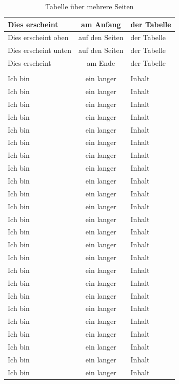 \documentclass[
12pt,
ngerman
]{scrreprt}
\begin{document}
\begin{longtable}{lcl}
  \toprule
  Dies erscheint & am Anfang & der Tabelle \\
  \bottomrule
  \endfirsthead
  \midrule
  Dies erscheint oben & auf den Seiten & der Tabelle \\
  \midrule
  \endhead
  \midrule
  Dies erscheint unten & auf den Seiten & der Tabelle \\
  \midrule
  \endfoot
  \toprule
  Dies erscheint & am Ende & der Tabelle \\
  \bottomrule
  \caption{Tabelle über mehrere Seiten} \\
  \endlastfoot
  \label{tab:longtable}
  Ich bin & ein langer & Inhalt \\
  Ich bin & ein langer & Inhalt \\
  Ich bin & ein langer & Inhalt \\
  Ich bin & ein langer & Inhalt \\
  Ich bin & ein langer & Inhalt \\
  Ich bin & ein langer & Inhalt \\
  Ich bin & ein langer & Inhalt \\
  Ich bin & ein langer & Inhalt \\
  Ich bin & ein langer & Inhalt \\
  Ich bin & ein langer & Inhalt \\
  Ich bin & ein langer & Inhalt \\
  Ich bin & ein langer & Inhalt \\
  Ich bin & ein langer & Inhalt \\
  Ich bin & ein langer & Inhalt \\
  Ich bin & ein langer & Inhalt \\
  Ich bin & ein langer & Inhalt \\
  Ich bin & ein langer & Inhalt \\
  Ich bin & ein langer & Inhalt \\
  Ich bin & ein langer & Inhalt \\
  Ich bin & ein langer & Inhalt \\
  Ich bin & ein langer & Inhalt \\
  Ich bin & ein langer & Inhalt \\
  Ich bin & ein langer & Inhalt \\
  Ich bin & ein langer & Inhalt \\

\end{longtable}
\end{document}
